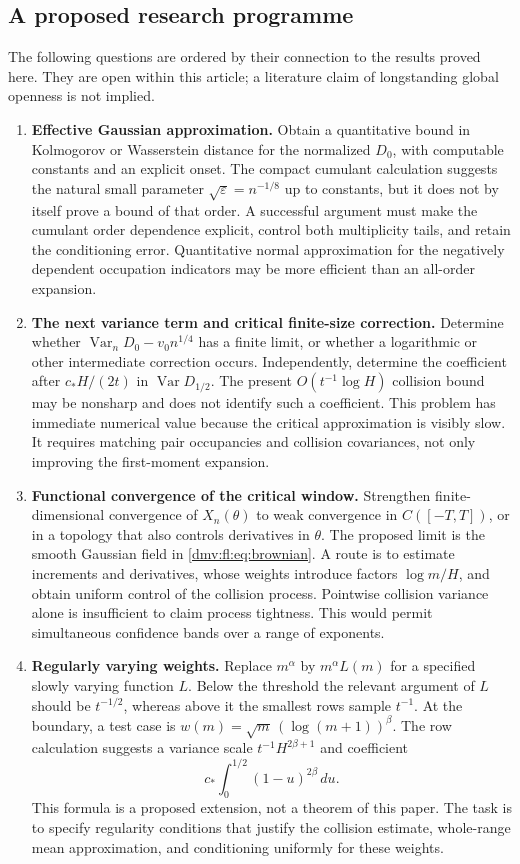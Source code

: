 \documentclass[11pt,letterpaper]{article}
\numberwithin{equation}{section}
\theoremstyle{definition}\newtheorem{definition}[theorem]{Definition}
\theoremstyle{remark}\newtheorem{remark}[theorem]{Remark}
\newcommand{\eps}{\varepsilon}
\DeclareMathOperator{\Var}{Var}
\begin{document}
\subsection{A proposed research programme}
The following questions are ordered by their connection to the
results proved here. They are open within this article; a literature
claim of longstanding global openness is not implied.

\begin{enumerate}[leftmargin=*,itemsep=8pt]
\item \textbf{Effective Gaussian approximation.}
Obtain a quantitative bound in Kolmogorov or Wasserstein distance for
the normalized $D_0$, with computable constants and an explicit onset.
The compact cumulant calculation suggests the natural small parameter
$\sqrt\eps=n^{-1/8}$ up to constants, but it does not by itself prove
a bound of that order. A successful argument must make the cumulant
order dependence explicit, control both multiplicity tails, and retain
the conditioning error. Quantitative normal approximation for the
negatively dependent occupation indicators may be more efficient than
an all-order expansion.

\item \textbf{The next variance term and critical finite-size correction.}
Determine whether
$\Var_nD_0-v_0n^{1/4}$ has a finite limit, or whether a logarithmic or
other intermediate correction occurs. Independently, determine the
coefficient after $c_*H/(2t)$ in $\Var D_{1/2}$. The present
$O(t^{-1}\log H)$ collision bound may be nonsharp and does not
identify such a coefficient. This problem has immediate numerical
value because the critical approximation is visibly slow. It requires
matching pair occupancies and collision covariances, not only improving
the first-moment expansion.

\item \textbf{Functional convergence of the critical window.}
Strengthen finite-dimensional convergence of $X_n(\theta)$ to weak
convergence in $C([-T,T])$, or in a topology that also controls
derivatives in $\theta$. The proposed limit is the smooth Gaussian
field in \eqref{dmv:fl:eq:brownian}. A route is to estimate increments and
derivatives, whose weights introduce factors $\log m/H$, and obtain
uniform control of the collision process. Pointwise collision variance
alone is insufficient to claim process tightness. This would permit
simultaneous confidence bands over a range of exponents.

\item \textbf{Regularly varying weights.}
Replace $m^\alpha$ by $m^\alpha L(m)$ for a specified slowly varying
function $L$. Below the threshold the relevant argument of $L$ should
be $t^{-1/2}$, whereas above it the smallest rows sample $t^{-1}$.
At the boundary, a test case is
$w(m)=\sqrt m\,(\log(m+1))^\beta$. The row calculation suggests a
variance scale $t^{-1}H^{2\beta+1}$ and coefficient
\[
 c_*\int_0^{1/2}(1-u)^{2\beta}\,du.
\]
This formula is a proposed extension, not a theorem of this paper.
The task is to specify regularity conditions that justify the
collision estimate, whole-range mean approximation, and conditioning
uniformly for these weights.


\end{enumerate}
\end{document}
